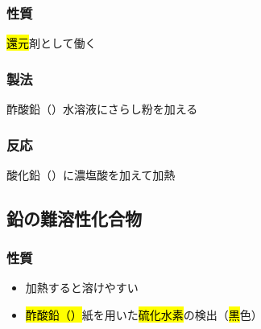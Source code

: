 \subsubsection{性質}
\hl{還元}剤として働く\\
\subsubsection{製法}
酢酸鉛（）水溶液にさらし粉を加える
\subsubsection{反応}
酸化鉛（）に濃塩酸を加えて加熱\\
\subsection{鉛の難溶性化合物}
\subsubsection{性質}
\begin{itemize}
    \item 加熱すると溶けやすい
    \item \hl{酢酸鉛（）}紙を用いた\hl{硫化水素}の検出（\hl{黒}色）
\end{itemize}